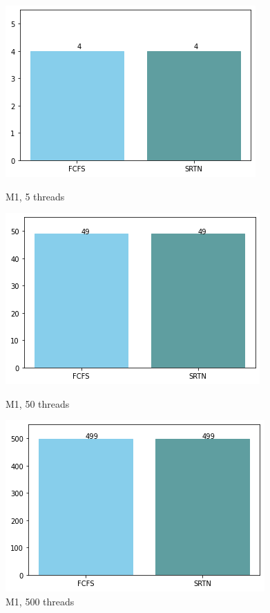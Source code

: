 \documentclass{beamer}
\begin{document}
\begin{frame}
\begin{figure}[!htb]
  \includegraphics[width=\linewidth]{imgs/contex5-1.png}
  \caption{M1, 5 threads}\label{fig:awesome_image1}
\endminipage\hfill
{}
  \includegraphics[width=\linewidth]{imgs/contex50-1.png}
  \caption{M1, 50 threads}\label{fig:awesome_image2}
\endminipage\hfill
{}%
  \includegraphics[width=\linewidth]{imgs/contex500-1.png}
  \caption{M1, 500 threads}\label{fig:awesome_image3}
\endminipage
\end{figure}


\end{frame}
\end{document}
